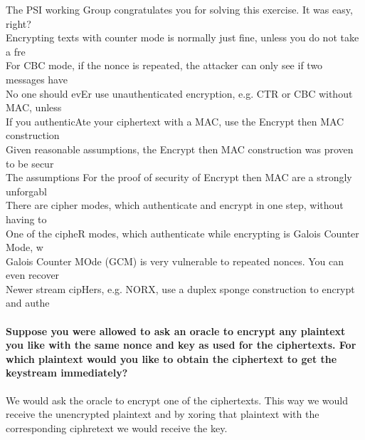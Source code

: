 The PSI working Group congratulates you for solving this exercise. It was easy, right?\\
Encrypting texts with counter mode is normally just fine, unless you do not take a fre\\
For CBC mode, if the nonce is repeated, the attacker can only see if two messages have\\
No one should evEr use unauthenticated encryption, e.g. CTR or CBC without MAC, unless\\
If you authenticAte your ciphertext with a MAC, use the Encrypt then MAC construction\\
Given reasonable assumptions, the Encrypt then MAC construction was proven to be secur\\
The assumptions For the proof of security of Encrypt then MAC are a strongly unforgabl\\
There are cipher modes, which authenticate and encrypt in one step, without having to\\
One of the cipheR modes, which authenticate while encrypting is Galois Counter Mode, w\\
Galois Counter MOde (GCM) is very vulnerable to repeated nonces. You can even recover\\
Newer stream cipHers, e.g. NORX, use a duplex sponge construction to encrypt and authe\\

\paragraph{Suppose you were allowed to ask an oracle to encrypt any plaintext you like with the same nonce and key as used for the ciphertexts. For which plaintext would you like to obtain the ciphertext to get the keystream immediately?}

We would ask the oracle to encrypt one of the ciphertexts. This way we would receive the unencrypted plaintext and by xoring that plaintext with the corresponding ciphretext we would receive the key.
